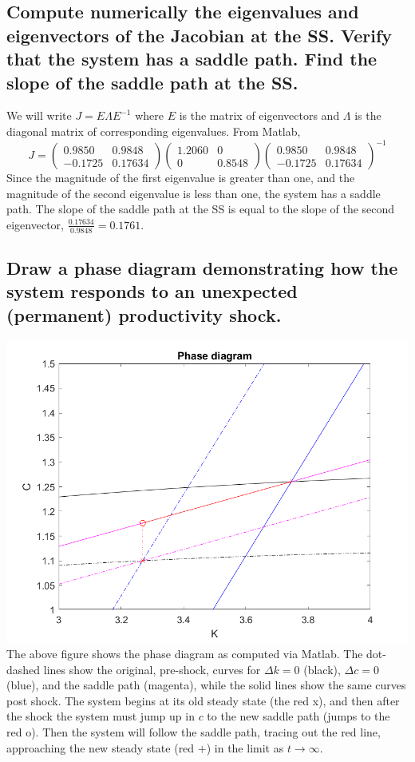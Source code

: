 \documentclass[11pt]{article} %
\begin{document}
\subsection{Compute numerically the eigenvalues and eigenvectors of the Jacobian at the SS. Verify that the system has a saddle path. Find the slope of the saddle path at the SS.}
We will write $J = E\Lambda E^{-1}$ where $E$ is the matrix of eigenvectors and $\Lambda$ is the diagonal matrix of corresponding eigenvalues. From Matlab,
\begin{equation*}
 J = \begin{pmatrix} 0.9850 & 0.9848 \\ -0.1725 & 0.17634 \end{pmatrix}  \begin{pmatrix} 1.2060 & 0 \\ 0 & 0.8548 \end{pmatrix}  \begin{pmatrix} 0.9850 & 0.9848 \\ -0.1725 & 0.17634 \end{pmatrix}^{-1}
\end{equation*}
Since the magnitude of the first eigenvalue is greater than one, and the magnitude of the second eigenvalue is less than one, the system has a saddle path. The slope of the saddle path at the SS is equal to the slope of the second eigenvector, $\frac{0.17634}{0.9848} = 0.1761.$

\subsection{Draw a phase diagram demonstrating how the system responds to an unexpected (permanent) productivity shock.}
\includegraphics{phase}
The above figure shows the phase diagram as computed via Matlab. The dot-dashed lines show the original, pre-shock, curves for $\Delta k = 0$ (black), $\Delta c = 0$ (blue), and the saddle path (magenta), while the solid lines show the same curves post shock. The system begins at its old steady state (the red x), and then after the shock the system must jump up in $c$ to the new saddle path (jumps to the red o). Then the system will follow the saddle path, tracing out the red line, approaching the new steady state (red $+$) in the limit as $t \rightarrow \infty$.
\end{document}
